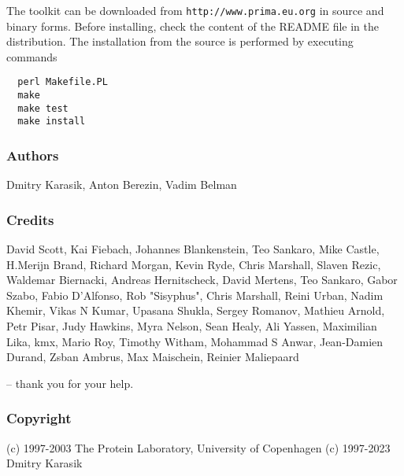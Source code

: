 \documentclass{report}
\begin{document}
The toolkit can be downloaded from \texttt{http://www.prima.eu.org} in
source and binary forms. Before installing, check the content of the README file
in the distribution. The installation from the source is performed by
executing commands
\begin{verbatim}
  perl Makefile.PL
  make
  make test
  make install
\end{verbatim}

\subsubsection{Authors}

Dmitry Karasik,
Anton Berezin,
Vadim Belman

\subsubsection{Credits}

David Scott,
Kai Fiebach,
Johannes Blankenstein,
Teo Sankaro,
Mike Castle,
H.Merijn Brand,
Richard Morgan,
Kevin Ryde,
Chris Marshall,
Slaven Rezic,
Waldemar Biernacki,
Andreas Hernitscheck,
David Mertens,
Teo Sankaro,
Gabor Szabo,
Fabio D'Alfonso,
Rob "Sisyphus",
Chris Marshall,
Reini Urban,
Nadim Khemir,
Vikas N Kumar,
Upasana Shukla,
Sergey Romanov,
Mathieu Arnold,
Petr Pisar,
Judy Hawkins,
Myra Nelson,
Sean Healy,
Ali Yassen,
Maximilian Lika,
kmx,
Mario Roy,
Timothy Witham,
Mohammad S Anwar,
Jean-Damien Durand,
Zsban Ambrus,
Max Maischein,
Reinier Maliepaard

-- thank you for your help.

\subsubsection{Copyright}

(c) 1997-2003 The Protein Laboratory, University of Copenhagen
(c) 1997-2023 Dmitry Karasik
\end{document}
